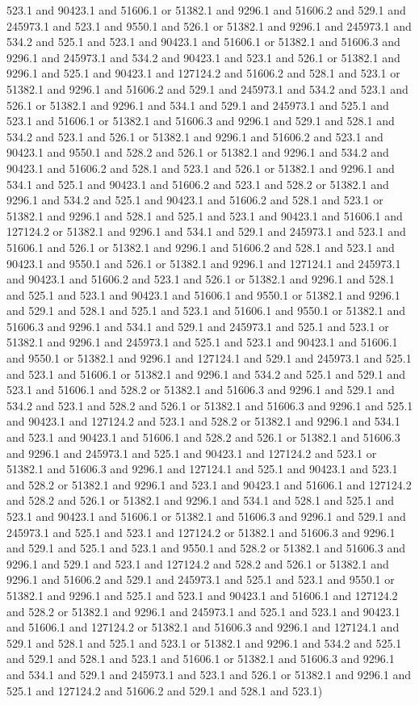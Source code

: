 523.1 and 90423.1 and 51606.1 or 51382.1 and 9296.1 and 51606.2 and
529.1 and 245973.1 and 523.1 and 9550.1 and 526.1 or 51382.1 and
9296.1 and 245973.1 and 534.2 and 525.1 and 523.1 and 90423.1 and
51606.1 or 51382.1 and 51606.3 and 9296.1 and 245973.1 and 534.2 and
90423.1 and 523.1 and 526.1 or 51382.1 and 9296.1 and 525.1 and
90423.1 and 127124.2 and 51606.2 and 528.1 and 523.1 or 51382.1 and
9296.1 and 51606.2 and 529.1 and 245973.1 and 534.2 and 523.1 and
526.1 or 51382.1 and 9296.1 and 534.1 and 529.1 and 245973.1 and 525.1
and 523.1 and 51606.1 or 51382.1 and 51606.3 and 9296.1 and 529.1 and
528.1 and 534.2 and 523.1 and 526.1 or 51382.1 and 9296.1 and 51606.2
and 523.1 and 90423.1 and 9550.1 and 528.2 and 526.1 or 51382.1 and
9296.1 and 534.2 and 90423.1 and 51606.2 and 528.1 and 523.1 and 526.1
or 51382.1 and 9296.1 and 534.1 and 525.1 and 90423.1 and 51606.2 and
523.1 and 528.2 or 51382.1 and 9296.1 and 534.2 and 525.1 and 90423.1
and 51606.2 and 528.1 and 523.1 or 51382.1 and 9296.1 and 528.1 and
525.1 and 523.1 and 90423.1 and 51606.1 and 127124.2 or 51382.1 and
9296.1 and 534.1 and 529.1 and 245973.1 and 523.1 and 51606.1 and
526.1 or 51382.1 and 9296.1 and 51606.2 and 528.1 and 523.1 and
90423.1 and 9550.1 and 526.1 or 51382.1 and 9296.1 and 127124.1 and
245973.1 and 90423.1 and 51606.2 and 523.1 and 526.1 or 51382.1 and
9296.1 and 528.1 and 525.1 and 523.1 and 90423.1 and 51606.1 and
9550.1 or 51382.1 and 9296.1 and 529.1 and 528.1 and 525.1 and 523.1
and 51606.1 and 9550.1 or 51382.1 and 51606.3 and 9296.1 and 534.1 and
529.1 and 245973.1 and 525.1 and 523.1 or 51382.1 and 9296.1 and
245973.1 and 525.1 and 523.1 and 90423.1 and 51606.1 and 9550.1 or
51382.1 and 9296.1 and 127124.1 and 529.1 and 245973.1 and 525.1 and
523.1 and 51606.1 or 51382.1 and 9296.1 and 534.2 and 525.1 and 529.1
and 523.1 and 51606.1 and 528.2 or 51382.1 and 51606.3 and 9296.1 and
529.1 and 534.2 and 523.1 and 528.2 and 526.1 or 51382.1 and 51606.3
and 9296.1 and 525.1 and 90423.1 and 127124.2 and 523.1 and 528.2 or
51382.1 and 9296.1 and 534.1 and 523.1 and 90423.1 and 51606.1 and
528.2 and 526.1 or 51382.1 and 51606.3 and 9296.1 and 245973.1 and
525.1 and 90423.1 and 127124.2 and 523.1 or 51382.1 and 51606.3 and
9296.1 and 127124.1 and 525.1 and 90423.1 and 523.1 and 528.2 or
51382.1 and 9296.1 and 523.1 and 90423.1 and 51606.1 and 127124.2 and
528.2 and 526.1 or 51382.1 and 9296.1 and 534.1 and 528.1 and 525.1
and 523.1 and 90423.1 and 51606.1 or 51382.1 and 51606.3 and 9296.1
and 529.1 and 245973.1 and 525.1 and 523.1 and 127124.2 or 51382.1 and
51606.3 and 9296.1 and 529.1 and 525.1 and 523.1 and 9550.1 and 528.2
or 51382.1 and 51606.3 and 9296.1 and 529.1 and 523.1 and 127124.2 and
528.2 and 526.1 or 51382.1 and 9296.1 and 51606.2 and 529.1 and
245973.1 and 525.1 and 523.1 and 9550.1 or 51382.1 and 9296.1 and
525.1 and 523.1 and 90423.1 and 51606.1 and 127124.2 and 528.2 or
51382.1 and 9296.1 and 245973.1 and 525.1 and 523.1 and 90423.1 and
51606.1 and 127124.2 or 51382.1 and 51606.3 and 9296.1 and 127124.1
and 529.1 and 528.1 and 525.1 and 523.1 or 51382.1 and 9296.1 and
534.2 and 525.1 and 529.1 and 528.1 and 523.1 and 51606.1 or 51382.1
and 51606.3 and 9296.1 and 534.1 and 529.1 and 245973.1 and 523.1 and
526.1 or 51382.1 and 9296.1 and 525.1 and 127124.2 and 51606.2 and
529.1 and 528.1 and 523.1)